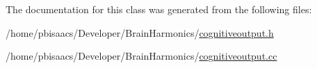 The documentation for this class was generated from the following files\+:\begin{DoxyCompactItemize}
\item 
/home/pbisaacs/\+Developer/\+Brain\+Harmonics/\mbox{\hyperlink{cognitiveoutput_8h}{cognitiveoutput.\+h}}\item 
/home/pbisaacs/\+Developer/\+Brain\+Harmonics/\mbox{\hyperlink{cognitiveoutput_8cc}{cognitiveoutput.\+cc}}\end{DoxyCompactItemize}

